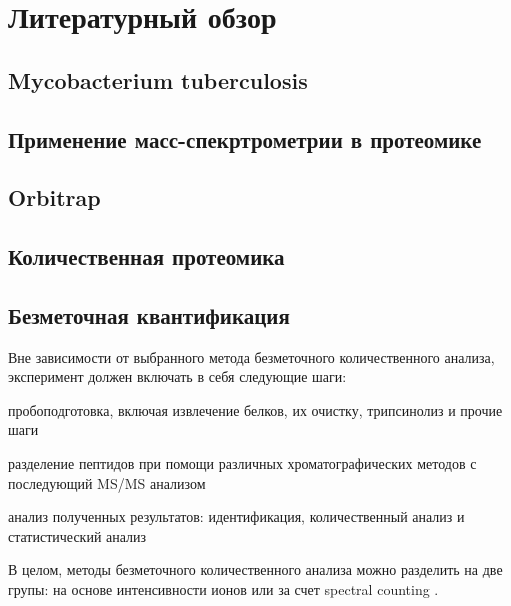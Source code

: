 \section{Литературный обзор}

\subsection{Mycobacterium tuberculosis}

\subsection{Применение масс-спекртрометрии в протеомике}

\subsection{Orbitrap}

\subsection{Количественная протеомика}


\subsection{Безметочная квантификация}
Вне зависимости от выбранного метода безметочного количественного анализа, эксперимент должен включать в себя следующие шаги:
\begin{inparaenum}
    \item  пробоподготовка, включая извлечение белков, их очистку, трипсинолиз и прочие шаги 
    \item разделение пептидов при помощи различных хроматографических методов с 
    последующий MS/MS анализом 
    \item анализ полученных результатов: идентификация, количественный анализ и статистический анализ
\end{inparaenum}
В целом, методы безметочного количественного анализа можно разделить на две групы: на основе интенсивности ионов или за счет spectral counting \cite{zhu2009mass}.

